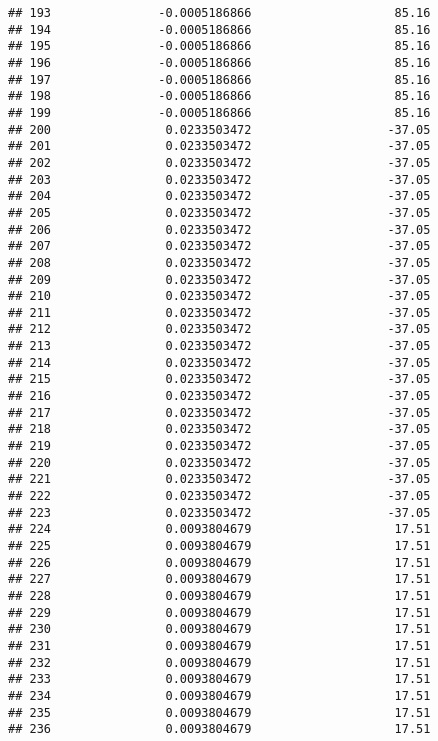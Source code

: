 \documentclass[]{article}
\begin{document}
\begin{verbatim}
## 193               -0.0005186866                    85.16
## 194               -0.0005186866                    85.16
## 195               -0.0005186866                    85.16
## 196               -0.0005186866                    85.16
## 197               -0.0005186866                    85.16
## 198               -0.0005186866                    85.16
## 199               -0.0005186866                    85.16
## 200                0.0233503472                   -37.05
## 201                0.0233503472                   -37.05
## 202                0.0233503472                   -37.05
## 203                0.0233503472                   -37.05
## 204                0.0233503472                   -37.05
## 205                0.0233503472                   -37.05
## 206                0.0233503472                   -37.05
## 207                0.0233503472                   -37.05
## 208                0.0233503472                   -37.05
## 209                0.0233503472                   -37.05
## 210                0.0233503472                   -37.05
## 211                0.0233503472                   -37.05
## 212                0.0233503472                   -37.05
## 213                0.0233503472                   -37.05
## 214                0.0233503472                   -37.05
## 215                0.0233503472                   -37.05
## 216                0.0233503472                   -37.05
## 217                0.0233503472                   -37.05
## 218                0.0233503472                   -37.05
## 219                0.0233503472                   -37.05
## 220                0.0233503472                   -37.05
## 221                0.0233503472                   -37.05
## 222                0.0233503472                   -37.05
## 223                0.0233503472                   -37.05
## 224                0.0093804679                    17.51
## 225                0.0093804679                    17.51
## 226                0.0093804679                    17.51
## 227                0.0093804679                    17.51
## 228                0.0093804679                    17.51
## 229                0.0093804679                    17.51
## 230                0.0093804679                    17.51
## 231                0.0093804679                    17.51
## 232                0.0093804679                    17.51
## 233                0.0093804679                    17.51
## 234                0.0093804679                    17.51
## 235                0.0093804679                    17.51
## 236                0.0093804679                    17.51

\end{verbatim}
\end{document}
